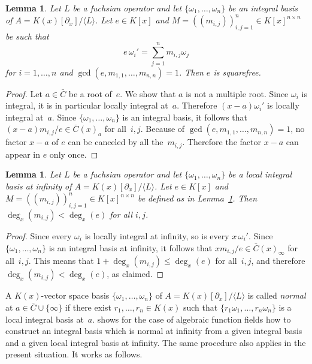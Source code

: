 \documentclass[final,1p,times,authoryear]{elsarticle}
\newtheorem{lemma}[theorem]{Lemma}
\def\<#1>{\langle#1\rangle}
\begin{document}
\begin{lemma}\label{lemma:e}
  Let $L$ be a fuchsian operator and let
  $\{\omega_1,\dots,\omega_n\}$ be an integral basis of $A=K(x)[\partial_x]/\<L>$.
  Let $e\in K[x]$ and
  $M=((m_{i,j}))_{i,j=1}^n\in K[x]^{n\times n}$ be such that
  \[
    e\,\omega_i'=\sum_{j=1}^n m_{i,j}\omega_j
  \]
  for $i=1,\dots,n$ and $\gcd(e,m_{1,1},\dots,m_{n,n})=1$.
  Then $e$ is squarefree.
\end{lemma}
\begin{proof}
  Let $a\in\bar C$ be a root of~$e$. We show that $a$ is not a multiple root.
  Since $\omega_i$ is integral, it is in particular locally integral at~$a$.
  Therefore $(x-a)\omega_i'$ is locally integral at~$a$.
  Since $\{\omega_1,\dots,\omega_n\}$ is an integral basis, it follows that
  $(x-a)m_{i,j}/e\in\bar C(x)_a$ for all~$i,j$.
  Because of $\gcd(e,m_{1,1},\dots,m_{n,n})=1$, no factor $x-a$ of $e$
  can be canceled by all the~$m_{i,j}$.
  Therefore the factor $x-a$ can appear in $e$ only once.
\end{proof}

\begin{lemma} \label{lemma:degM}
  Let $L$ be a fuchsian operator and let $\{\omega_1,\dots,\omega_n\}$ be a local integral
  basis at infinity of $A=K(x)[\partial_x]/\<L>$. Let $e\in K[x]$ and $M=((m_{i,j}))_{i,j=1}^n\in K[x]^{n\times n}$
  be defined as in Lemma~\ref{lemma:e}. Then $\deg_x(m_{i,j})<\deg_x(e)$ for all $i,j$.
\end{lemma}
\begin{proof}
  Since every $\omega_i$ is locally integral at infinity, so is every $x\,\omega_i'$.
  Since $\{\omega_1,\dots,\omega_n\}$ is an integral basis at infinity, it follows that
  $xm_{i,j}/e\in\bar C(x)_\infty$ for all~$i,j$. This means that $1+\deg_x(m_{i,j})\leq\deg_x(e)$
  for all~$i,j$, and therefore $\deg_x(m_{i,j})<\deg_x(e)$, as claimed.
\end{proof}

A $K(x)$-vector space basis $\{\omega_1,\dots,\omega_n\}$ of $A=K(x)[\partial_x]/\<L>$ is
called \emph{normal} at $a\in\bar C\cup\{\infty\}$ if there exist $r_1,\dots,r_n\in
K(x)$ such that $\{r_1\omega_1,\dots,r_n\omega_n\}$ is a local integral basis
at~$a$. \cite{trager84} shows for the case of algebraic function fields how to construct
an integral basis which is normal at infinity from a given integral basis and
a given local integral basis at infinity. The same procedure also applies
in the present situation. It works as follows.
\end{document}
